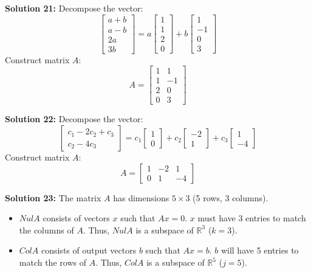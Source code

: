 \documentclass[11pt]{article}
\begin{document}
\vspace{0.3cm}
\textbf{Solution 21:} Decompose the vector:
$$ \begin{bmatrix} a+b \\ a-b \\ 2a \\ 3b \end{bmatrix} = a \begin{bmatrix} 1 \\ 1 \\ 2 \\ 0 \end{bmatrix} + b \begin{bmatrix} 1 \\ -1 \\ 0 \\ 3 \end{bmatrix} $$
Construct matrix $A$:
$$ A = \begin{bmatrix} 1 & 1 \\ 1 & -1 \\ 2 & 0 \\ 0 & 3 \end{bmatrix} $$

\vspace{0.3cm}
\textbf{Solution 22:} Decompose the vector:
$$ \begin{bmatrix} c_1 - 2c_2 + c_3 \\ c_2 - 4c_3 \end{bmatrix} = c_1 \begin{bmatrix} 1 \\ 0 \end{bmatrix} + c_2 \begin{bmatrix} -2 \\ 1 \end{bmatrix} + c_3 \begin{bmatrix} 1 \\ -4 \end{bmatrix} $$
Construct matrix $A$:
$$ A = \begin{bmatrix} 1 & -2 & 1 \\ 0 & 1 & -4 \end{bmatrix} $$

\vspace{0.3cm}
\textbf{Solution 23:} The matrix $A$ has dimensions $5 \times 3$ (5 rows, 3 columns).
\begin{itemize}
    \item $Nul A$ consists of vectors $x$ such that $Ax = 0$. $x$ must have 3 entries to match the columns of $A$. Thus, $Nul A$ is a subspace of $\mathbb{R}^3$ ($k=3$).
    \item $Col A$ consists of output vectors $b$ such that $Ax = b$. $b$ will have 5 entries to match the rows of $A$. Thus, $Col A$ is a subspace of $\mathbb{R}^5$ ($j=5$).
\end{itemize}
\end{document}
